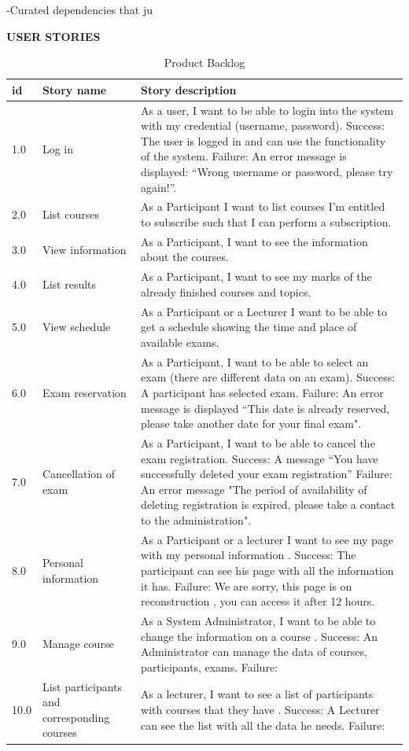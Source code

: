 \documentclass{scrartcl}
\begin{document}
-Curated dependencies that ju \begin{table}[H]
\begin{center}
\textbf{USER STORIES }\\[1cm]
\begin{tabular}{| p{2.5cm}| p{4cm} | p{9cm} |}
\hline
\textbf{id} & \textbf{Story name} & \textbf{Story description}\\
\hline      
	
	1.0 & Log in & As a user, I want to be able to login into the system with my credential (username, password).
 Success: The user is logged in and can use the functionality of the system.
 Failure: An error message is displayed: “Wrong username or password, please try again!”. \\ \hline
	2.0 & List courses & As a Participant I want to list courses I'm entitled to subscribe such that I can perform a subscription. \\ \hline
	3.0 & View information & As a Participant, I want to see the information about the courses. \\ \hline
	4.0 & List results & As a Participant, I want to see my marks of the already finished courses and topics. \\ \hline
	5.0 & View schedule & As a Participant or a Lecturer I want to be able to get a schedule showing the time and place of available exams. \\ \hline
	6.0 & Exam reservation & As a Participant, I want to be able to select an exam (there are different data on an exam).
 Success: A participant has selected exam.
 Failure: An error message is displayed “This date is already reserved, please take another date for your final exam". \\ \hline
	7.0 & Cancellation of exam & As a Participant, I want to be able to cancel the exam registration.
 Success: A message “You have successfully deleted your exam registration”
 Failure: An error message "The period of availability of deleting registration is expired, please take a contact to the administration". \\ \hline
	8.0 & Personal information & As a Participant or a lecturer I want to see my page with my personal information .
 Success: The participant can see his page with all the information it has.
 Failure: We are sorry, this page is on reconstruction , you can access it after 12 hours. \\ \hline
	9.0 & Manage course & As a System Administrator, I want to be able to change the information on a course .
 Success: An Administrator can manage the data of courses, participants, exams.
 Failure: \\ \hline
	10.0 & List participants and corresponding courses & As a lecturer, I want to see a list of participants with courses that they have .
 Success: A Lecturer can see the list with all the data he needs.
 Failure: \\ \hline


        
        \end{tabular}
\end{center}
\caption{Product Backlog}
\label{table2}
\end{table}
\end{document}

